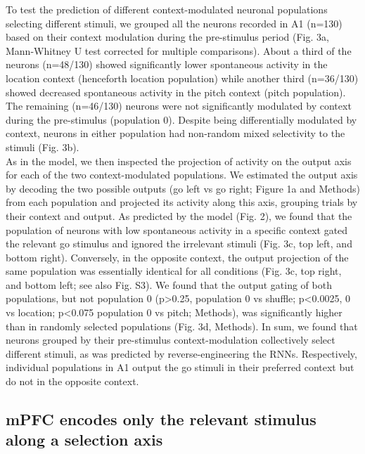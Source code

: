 \documentclass[12pt]{article}
\begin{document}
To test the prediction of different context-modulated neuronal populations selecting different stimuli, we grouped all the neurons recorded in A1 (n=130) based on their context modulation during the pre-stimulus period (Fig. 3a, Mann-Whitney U test corrected for multiple comparisons). About a third of the neurons (n=48/130) showed significantly lower spontaneous activity in the location context (henceforth location population) while another third (n=36/130) showed decreased spontaneous activity in the pitch context (pitch population). The remaining (n=46/130) neurons were not significantly modulated by context during the pre-stimulus (population 0). Despite being differentially modulated by context, neurons in either population had non-random mixed selectivity to the stimuli (Fig. 3b). \\

As in the model, we then inspected the projection of activity on the output axis for each of the two context-modulated populations. We estimated the output axis by decoding the two possible outputs (go left vs go right; Figure 1a and Methods) from each population and projected its activity along this axis, grouping trials by their context and output. As predicted by the model (Fig. 2), we found that the population of neurons with low spontaneous activity in a specific context gated the relevant go stimulus and ignored the irrelevant stimuli (Fig. 3c, top left, and bottom right). Conversely, in the opposite context, the output projection of the same population was essentially identical for all conditions (Fig. 3c, top right, and bottom left; see also Fig. S3). We found that the output gating of both populations, but not population 0 (p>0.25, population 0 vs shuffle; p<0.0025, 0 vs location; p<0.075 population 0 vs pitch; Methods), was significantly higher than in randomly selected populations (Fig. 3d, Methods). In sum, we found that neurons grouped by their pre-stimulus context-modulation collectively select different stimuli, as was predicted by reverse-engineering the RNNs. Respectively, individual populations in A1 output the go stimuli in their preferred context but do not in the opposite context. \\


\subsection*{mPFC encodes only the relevant stimulus along a selection axis}
\end{document}

